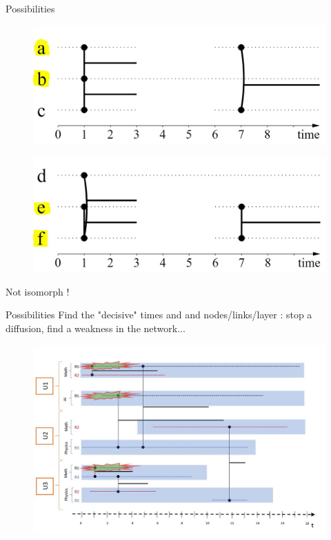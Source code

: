 \documentclass[15pt]{beamer}
\begin{document}
\begin{frame}{Possibilities}
    \begin{minipage}{0.4\linewidth}
		\begin{figure}
			\centering
			\includegraphics[width=\linewidth]{img/iso1multi.jpg}
			\label{influ}
		\end{figure}
	\end{minipage}
	\begin{minipage}{0.4\linewidth}
		\begin{figure}
			\centering
			\includegraphics[width=\linewidth]{img/iso2multi.jpg}
			\label{influ}
		\end{figure}
	\end{minipage}
		\pause
		
	Not isomorph !
\end{frame}
\begin{frame}{Possibilities} %
Find the "decisive" times and and nodes/links/layer : stop a diffusion, find a weakness in the network...

\begin{figure}
	\centering
    \includegraphics[width=\linewidth]{img/epidemiet0.jpg}
    \label{fig:chercheurs}	
\end{figure}
\end{frame}
\end{document}

